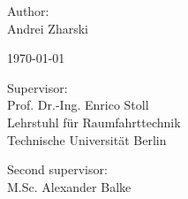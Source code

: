 \begin{titlepage}
\begin{center}
    \vspace{2cm}

    Author:\\
    Andrei Zharski

    \vspace{1cm}

    \today
\end{center}

\vfill

\noindent
\begin{minipage}[t]{0.48\textwidth}
    Supervisor:\\
    Prof. Dr.-Ing. Enrico Stoll\\
    Lehrstuhl für Raumfahrttechnik\\
    Technische Universität Berlin
\end{minipage}%
\hfill
\begin{minipage}[t]{0.48\textwidth}
    \raggedleft
    Second supervisor:\\
    M.Sc. Alexander Balke\\
\end{minipage}


\end{titlepage}


